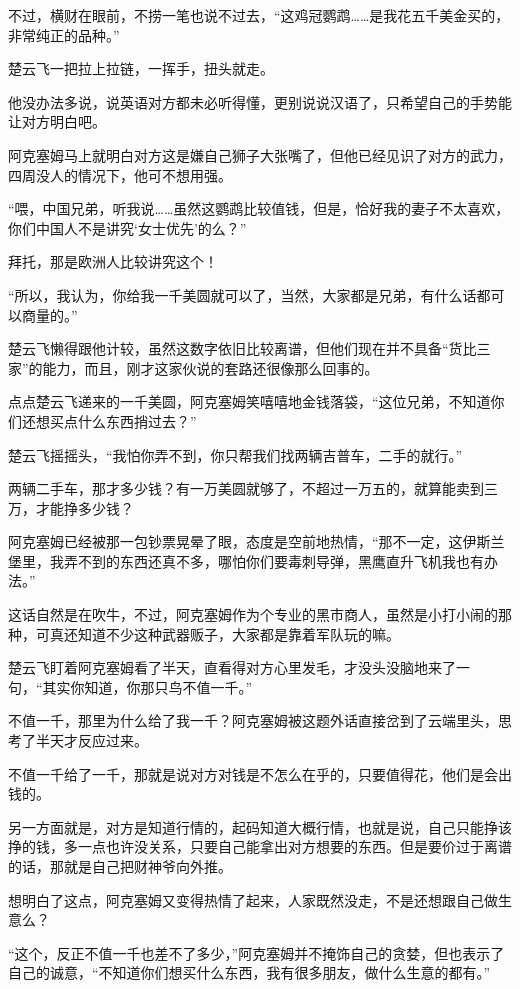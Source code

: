 不过，横财在眼前，不捞一笔也说不过去，“这鸡冠鹦鹉……是我花五千美金买的，非常纯正的品种。”

楚云飞一把拉上拉链，一挥手，扭头就走。

他没办法多说，说英语对方都未必听得懂，更别说说汉语了，只希望自己的手势能让对方明白吧。

阿克塞姆马上就明白对方这是嫌自己狮子大张嘴了，但他已经见识了对方的武力，四周没人的情况下，他可不想用强。

“喂，中国兄弟，听我说……虽然这鹦鹉比较值钱，但是，恰好我的妻子不太喜欢，你们中国人不是讲究‘女士优先’的么？”

拜托，那是欧洲人比较讲究这个！

“所以，我认为，你给我一千美圆就可以了，当然，大家都是兄弟，有什么话都可以商量的。”

楚云飞懒得跟他计较，虽然这数字依旧比较离谱，但他们现在并不具备“货比三家”的能力，而且，刚才这家伙说的套路还很像那么回事的。

点点楚云飞递来的一千美圆，阿克塞姆笑嘻嘻地金钱落袋，“这位兄弟，不知道你们还想买点什么东西捎过去？”

楚云飞摇摇头，“我怕你弄不到，你只帮我们找两辆吉普车，二手的就行。”

两辆二手车，那才多少钱？有一万美圆就够了，不超过一万五的，就算能卖到三万，才能挣多少钱？

阿克塞姆已经被那一包钞票晃晕了眼，态度是空前地热情，“那不一定，这伊斯兰堡里，我弄不到的东西还真不多，哪怕你们要毒刺导弹，黑鹰直升飞机我也有办法。”

这话自然是在吹牛，不过，阿克塞姆作为个专业的黑市商人，虽然是小打小闹的那种，可真还知道不少这种武器贩子，大家都是靠着军队玩的嘛。

楚云飞盯着阿克塞姆看了半天，直看得对方心里发毛，才没头没脑地来了一句，“其实你知道，你那只鸟不值一千。”

不值一千，那里为什么给了我一千？阿克塞姆被这题外话直接岔到了云端里头，思考了半天才反应过来。

不值一千给了一千，那就是说对方对钱是不怎么在乎的，只要值得花，他们是会出钱的。

另一方面就是，对方是知道行情的，起码知道大概行情，也就是说，自己只能挣该挣的钱，多一点也许没关系，只要自己能拿出对方想要的东西。但是要价过于离谱的话，那就是自己把财神爷向外推。

想明白了这点，阿克塞姆又变得热情了起来，人家既然没走，不是还想跟自己做生意么？

“这个，反正不值一千也差不了多少，”阿克塞姆并不掩饰自己的贪婪，但也表示了自己的诚意，“不知道你们想买什么东西，我有很多朋友，做什么生意的都有。”

